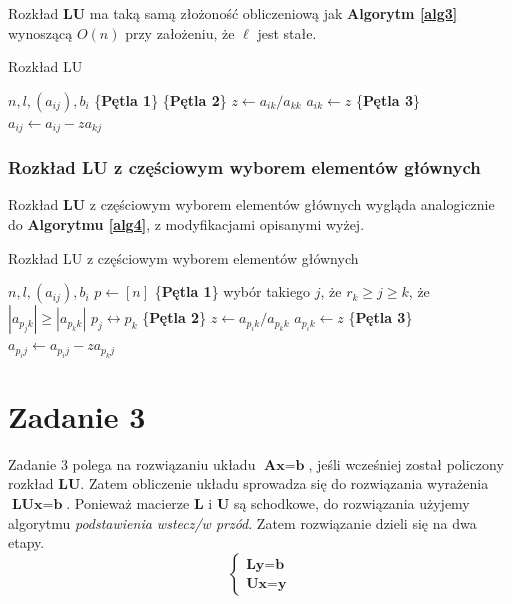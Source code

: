 \documentclass[12pt]{article}
\begin{document}
Rozkład \textbf{LU} ma taką samą złożoność obliczeniową jak \textbf{Algorytm \ref{alg3}} wynoszącą $O(n)$ przy założeniu, że $\ell$ jest stałe.
\begin{algorithm} %
\caption{Rozkład LU}
\label{alg5} %
\begin{algorithmic} %
    \REQUIRE $n, l, (a_{ij}), b_i$
    \STATE \{\textbf{Pętla 1}\}
    		\STATE \{\textbf{Pętla 2}\}
		\STATE $z \leftarrow a_{ik}/a_{kk}$
		\STATE $a_{ik} \leftarrow z$
    			\STATE \{\textbf{Pętla 3}\}
				\STATE $a_{ij} \leftarrow a_{ij} - z a_{kj}$
    			\ENDFOR
    		\ENDFOR
    \ENDFOR
\end{algorithmic}
\end{algorithm}

\clearpage
\subsubsection*{Rozkład LU z częściowym wyborem elementów głównych}
Rozkład \textbf{LU} z częściowym wyborem elementów głównych wygląda analogicznie do \textbf{Algorytmu \ref{alg4}}, z modyfikacjami opisanymi wyżej.
\begin{algorithm} %
\caption{Rozkład LU z częściowym wyborem elementów głównych}
\label{alg6} %
\begin{algorithmic} %
    \REQUIRE $n, l, (a_{ij}), b_i$
    \STATE $p \leftarrow [n]$
    \STATE \{\textbf{Pętla 1}\}
		\STATE wybór takiego $j$, że $r_k \geq j \geq k$, że $|a_{p_jk}| \geq |a_{p_kk}|$
		\STATE $p_j \leftrightarrow p_k$
    		\STATE \{\textbf{Pętla 2}\}
		\STATE $z \leftarrow a_{p_ik}/a_{p_kk}$
		\STATE $a_{p_ik} \leftarrow z$
    			\STATE \{\textbf{Pętla 3}\}
				\STATE $a_{p_ij} \leftarrow a_{p_ij} - z a_{p_kj}$
    			\ENDFOR
    		\ENDFOR
    \ENDFOR
\end{algorithmic}
\end{algorithm}

\section{Zadanie 3}
Zadanie 3 polega na rozwiązaniu układu $\textbf{A}\textbf{x} = \textbf{b}$, jeśli wcześniej został policzony rozkład \textbf{LU}. Zatem obliczenie układu sprowadza się do rozwiązania wyrażenia $\textbf{L} \textbf{U} \textbf{x} = \textbf{b}$. Ponieważ macierze \textbf{L} i \textbf{U} są schodkowe, do rozwiązania użyjemy algorytmu \textit{podstawienia wstecz/w przód}. Zatem rozwiązanie dzieli się na dwa etapy.
\begin{equation}
\begin{cases} 
\textbf{L} \textbf{y} = \textbf{b}\\
\textbf{U} \textbf{x} = \textbf{y}
\end{cases}
\end{equation}
\end{document}
